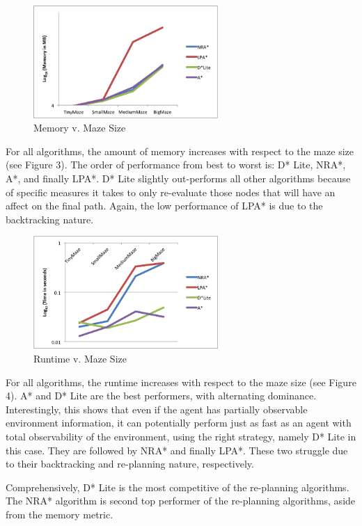 	\begin{figure}[htb!]
		\centering
		\includegraphics[width=7cm]{Memory.png}
		\caption{Memory v. Maze Size}
		\label{fig:3}
	\end{figure}

	For all algorithms, the amount of memory increases with respect to the maze size (see Figure 3). The order of performance from best to worst is: D* Lite, NRA*, A*, and finally LPA*. D* Lite slightly out-performs all other algorithms because of specific measures it takes to only re-evaluate those nodes that will have an affect on the final path. Again, the low performance of LPA* is due to the backtracking nature.  

	\begin{figure}[htb!]
		\centering
		\includegraphics[width=7cm]{Time.png}
		\caption{Runtime v. Maze Size}
		\label{fig:4}
	\end{figure}

	For all algorithms, the runtime  increases with respect to the maze size (see Figure 4). A* and D* Lite are the best performers, with alternating dominance. Interestingly, this shows that even if the agent has partially observable environment information, it can potentially perform just as fast as an agent with total observability of the environment, using the right strategy, namely D* Lite in this case. They are followed by NRA* and finally LPA*. These two struggle due to their backtracking and re-planning nature, respectively.
	
	Comprehensively, D* Lite is the most competitive of the re-planning algorithms. The NRA* algorithm is second top performer of the re-planning algorithms, aside from the memory metric.